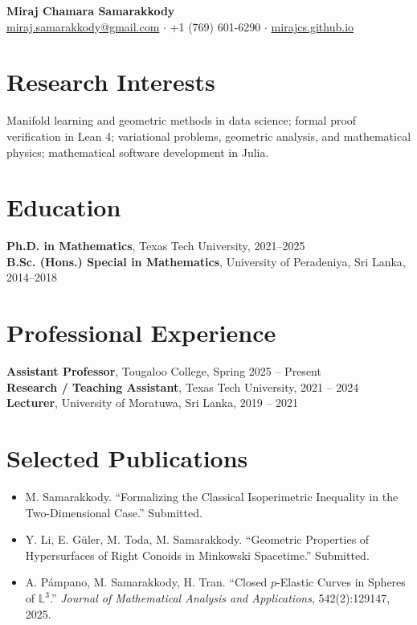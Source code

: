 \documentclass[11pt]{article}
\begin{document}
\begin{center}
	{\Large \textbf{Miraj Chamara Samarakkody}}\\[2pt]
	\href{mailto:miraj.samarakkody@gmail.com}{miraj.samarakkody@gmail.com} $\cdot$ +1 (769) 601-6290 $\cdot$ \href{https://mirajcs.github.io/}{mirajcs.github.io}
\end{center}

\section*{Research Interests}
Manifold learning and geometric methods in data science; formal proof verification in Lean 4; variational problems, geometric analysis, and mathematical physics; mathematical software development in Julia.

\section*{Education}
\textbf{Ph.D. in Mathematics}, Texas Tech University, 2021--2025\\
\textbf{B.Sc. (Hons.) Special in Mathematics}, University of Peradeniya, Sri Lanka, 2014--2018

\section*{Professional Experience}
\textbf{Assistant Professor}, Tougaloo College, Spring 2025 -- Present\\
\textbf{Research / Teaching Assistant}, Texas Tech University, 2021 -- 2024\\
\textbf{Lecturer}, University of Moratuwa, Sri Lanka, 2019 -- 2021

\section*{Selected Publications}
\begin{itemize}
	\item M. Samarakkody. ``Formalizing the Classical Isoperimetric Inequality in the Two-Dimensional Case.'' Submitted.
	\item Y. Li, E. G\"uler, M. Toda, M. Samarakkody. ``Geometric Properties of Hypersurfaces of Right Conoids in Minkowski Spacetime.'' Submitted.
	\item A. P\'ampano, M. Samarakkody, H. Tran. ``Closed $p$-Elastic Curves in Spheres of $\mathbb{L}^{3}$.'' \emph{Journal of Mathematical Analysis and Applications}, 542(2):129147, 2025.
\end{itemize}
\end{document}
